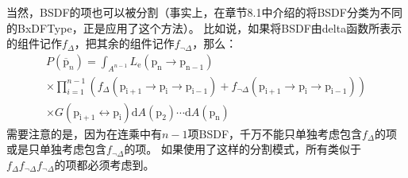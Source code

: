 \documentclass[a4paper]{article}
\begin{document}
	当然，BSDF的项也可以被分割（事实上，在章节8.1中介绍的将BSDF分类为不同的BxDFType，正是应用了这个方法）。
	比如说，如果将BSDF由delta函数所表示的组件记作$f_{\Delta}$，把其余的组件记作$f_{\neg\Delta}$，那么：
	\begin{multline*}
		P\left(\overline{\mathrm{p}}_{n}\right)=\int_{A^{n-1}} L_{\mathrm{e}}\left(\mathrm{p}_{\mathrm{n}} \rightarrow \mathrm{p}_{\mathrm{n}-1}\right) \\
		\times \prod_{i=1}^{n-1}\left(f_{\Delta}\left(\mathrm{p}_{\mathrm{i}+1} \rightarrow \mathrm{p}_{\mathrm{i}} \rightarrow \mathrm{p}_{\mathrm{i}-1}\right)+f_{\neg \Delta}\left(\mathrm{p}_{\mathrm{i}+1} \rightarrow \mathrm{p}_{\mathrm{i}} \rightarrow \mathrm{p}_{\mathrm{i}-1}\right)\right) \\
		\times G\left(\mathrm{p}_{\mathrm{i}+1} \leftrightarrow \mathrm{p}_{\mathrm{i}}\right) \mathrm{d} A\left(\mathrm{p}_{2}\right) \cdots \mathrm{d} A\left(\mathrm{p}_{\mathrm{n}}\right)
	\end{multline*}
	需要注意的是，因为在连乘中有$n-1$项BSDF，千万不能只单独考虑包含$f_{\Delta}$的项或是只单独考虑包含$f_{\neg\Delta}$的项。
	如果使用了这样的分割模式，所有类似于$f_\Delta f_{\neg\Delta}f_{\neg\Delta}$的项都必须考虑到。
\end{document}
